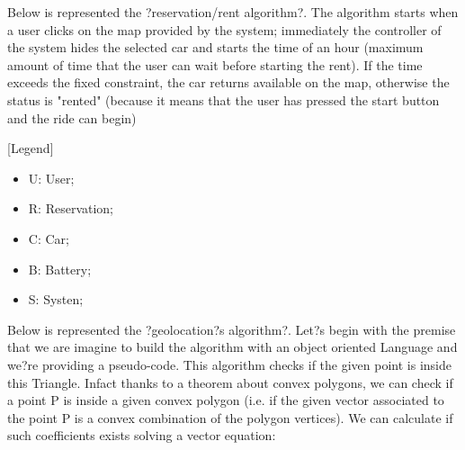 Below is represented the ?reservation/rent algorithm?. The algorithm starts when a user clicks on the map provided by the system; immediately the controller of the system hides the selected car and starts the time of an hour (maximum amount of time that the user can wait before starting the rent). If the time exceeds the fixed constraint, the car returns available on the map, otherwise the status is "rented" (because it means that the user has pressed the start button and the ride can begin)

[Legend]
\begin{itemize}
	\item U: User;
	\item R: Reservation;
	\item C:  Car;
	\item B: Battery;
	\item S: Systen;
\end{itemize}



Below is represented the ?geolocation?s algorithm?. Let?s begin with the premise that we are imagine to build the algorithm with an object oriented Language and we?re providing a pseudo-code. This algorithm checks if the given point is inside this Triangle. Infact thanks to a theorem about convex polygons, we can check if a point P is inside a given convex polygon (i.e. if the given vector associated to the point P is a convex combination of the polygon vertices). We can calculate if such coefficients exists solving a vector equation:

